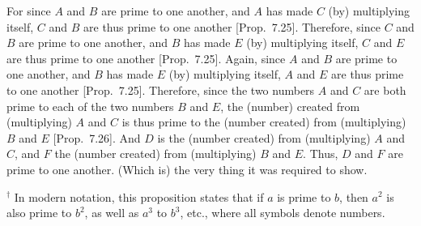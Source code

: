 \begin{Parallel}{}{}
{For since $A$ and $B$ are prime to one another, and $A$ has made $C$ (by)
multiplying itself, $C$ and $B$ are thus prime to one another [Prop.~7.25]. Therefore, since
$C$ and $B$ are prime to one another, and $B$ has made $E$ (by) multiplying itself,
$C$ and $E$ are thus prime to one another [Prop.~7.25].  Again, since $A$ and $B$ are prime to
one another, and $B$ has made $E$ (by) multiplying itself, $A$ and $E$ are thus
prime to one another [Prop.~7.25]. Therefore,
since the two numbers $A$ and $C$ are both prime to each of the two numbers
$B$ and $E$, the (number) created from (multiplying) $A$ and $C$ is thus
prime to the (number created) from (multiplying) $B$ and $E$ [Prop.~7.26]. And $D$ is the (number created)
from (multiplying) $A$ and $C$, and $F$ the (number created) from (multiplying)
$B$ and $E$. Thus, $D$ and $F$ are prime to one another. (Which is) the 
very thing it
was required to show.}
\end{Parallel}
{\footnotesize\noindent$^\dag$ In modern notation, this proposition
states that if $a$ is prime to $b$, then $a^2$ is also prime to $b^2$,
as well as $a^3$ to $b^3$, etc., where all symbols denote numbers.}

